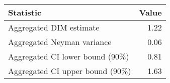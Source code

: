 \begin{tabular}{lr}
  \hline
Statistic & Value \\ 
  \hline
Aggregated DIM estimate & 1.22 \\ 
  Aggregated Neyman variance & 0.06 \\ 
  Aggregated CI lower bound (90\%) & 0.81 \\ 
  Aggregated CI upper bound (90\%) & 1.63 \\ 
   \hline
\end{tabular}
